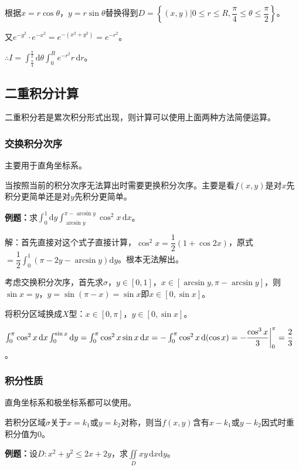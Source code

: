 \documentclass[UTF8, 12pt]{ctexart}
\begin{document}
根据$x=r\cos\theta$，$y=r\sin\theta$替换得到$D=\left\{(x,y)\bigg|0\leqslant r\leqslant R,\dfrac{\pi}{4}\leqslant\theta\leqslant\dfrac{\pi}{2}\right\}$。

又$e^{-y^2}\cdot e^{-x^2}=e^{-(x^2+y^2)}=e^{-r^2}$。

$\therefore I=\int_{\frac{\pi}{4}}^{\frac{\pi}{2}}\textrm{d}\theta\int_0^Re^{-r^2}r\,\textrm{d}r$。

\subsection{二重积分计算}

二重积分若是累次积分形式出现，则计算可以使用上面两种方法简便运算。

\subsubsection{交换积分次序}

主要用于直角坐标系。

当按照当前的积分次序无法算出时需要更换积分次序。主要是看$f(x,y)$是对$x$先积分更简单还是对$y$先积分更简单。

\textbf{例题：}求$\int_0^1\textrm{d}y\int_{\arcsin y}^{\pi-\arcsin y}\cos^2x\,\textrm{d}x$。

解：首先直接对这个式子直接计算，$\cos^2x=\dfrac{1}{2}(1+\cos2x)$，原式$=\dfrac{1}{2}\int_0^1(\pi-2y-\arcsin y)\textrm{d}y$。根本无法解出。

考虑交换积分次序，首先求$\sigma$，$y\in[0,1]$，$x\in[\arcsin y,\pi-\arcsin y]$，则$\sin x=y$，$y=\sin(\pi-x)=\sin x$即$x\in[0,\sin x]$。

将积分区域换成$X$型：$x\in[0,\pi]$，$y\in[0,\sin x]$。

$\int_0^\pi\cos^2x\,\textrm{d}x\int_0^{\sin x}\textrm{d}y=\int_0^\pi\cos^2x\sin x\,\textrm{d}x=-\int_0^\pi\cos^2x\,\textrm{d}(\cos x)=-\dfrac{\cos^3x}{3}\bigg|_0^\pi\\=\dfrac{2}{3}$。

\subsubsection{积分性质}

直角坐标系和极坐标系都可以使用。

若积分区域$\sigma$关于$x=k_1$或$y=k_2$对称，则当$f(x,y)$含有$x-k_1$或$y-k_2$因式时重积分值为0。

\textbf{例题：}设$D:x^2+y^2\leqslant2x+2y$，求$\iint\limits_Dxy\,\textrm{d}x\textrm{d}y$。
\end{document}
